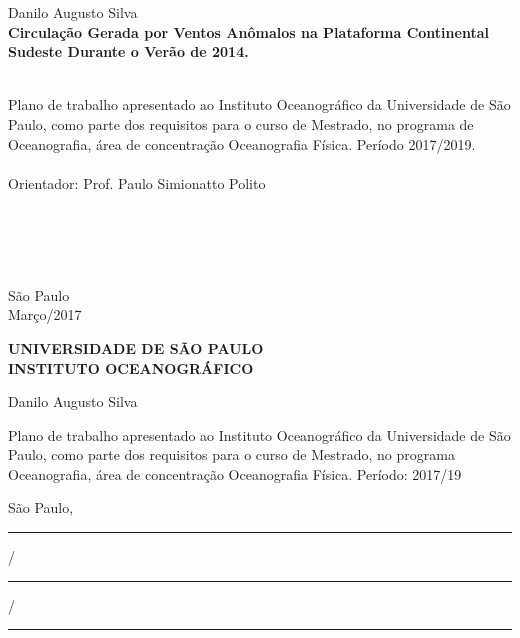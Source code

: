 \documentclass[12pt,times,portuguese,a4paper,pdftex]{article}
\begin{document}
\begin{center}
\thispagestyle{empty}
\Large Danilo Augusto Silva \\[3.5cm] 
\textbf{\huge Circulação Gerada por Ventos Anômalos na Plataforma Continental Sudeste Durante o Verão de 2014. } 
\ \\ \ 

\bigskip\bigskip\bigskip\bigskip\bigskip\bigskip\bigskip\bigskip

\begin{flushright}
  \begin{minipage}{8cm}
  \small Plano de trabalho apresentado ao Instituto Oceanográfico da Universidade de São Paulo, como parte dos requisitos
  para o curso de Mestrado, no programa de Oceanografia, área de concentração Oceanografia Física. Período 2017/2019. \\ \ \\
  Orientador: Prof. Paulo Simionatto Polito\\ \ \\ \ \\ \ \\
  \end{minipage}
\end{flushright}

\ \\[3cm] São Paulo \\ Março/2017
\end{center} 
 

\newpage
\tableofcontents







\newpage
\begin{center}
\textbf{\large UNIVERSIDADE DE SÃO PAULO}\\
\textbf{\large INSTITUTO OCEANOGRÁFICO}

\bigskip\bigskip\bigskip\bigskip

\bigskip\bigskip\bigskip\bigskip

\large Danilo Augusto Silva

\bigskip\bigskip\bigskip\bigskip

Plano de trabalho apresentado ao Instituto
Oceanográfico da Universidade de São Paulo, como
parte dos requisitos para o curso de Mestrado,
no programa Oceanografia, área de concentração
Oceanografia Física. Período: 2017/19

\bigskip\bigskip\bigskip\bigskip

São Paulo, \rule[0.3mm]{0.5cm}{0.3mm} /\rule[0.3mm]{0.5cm}{0.3mm} /\rule[0.3mm]{1cm}{0.3mm}

\bigskip\bigskip\bigskip\bigskip

\end{center}
\end{document}
